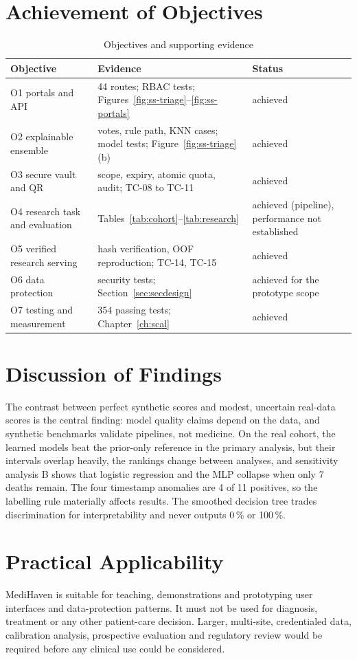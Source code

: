 \section{Achievement of Objectives}
\begin{table}[!htbp]
\centering
\caption{Objectives and supporting evidence}
\label{tab:objectives}
\small
\begin{tabularx}{\textwidth}{@{}lYl@{}}
\toprule
Objective & Evidence & Status\\
\midrule
O1 portals and API & 44 routes; RBAC tests; Figures~\ref{fig:ss-triage}--\ref{fig:ss-portals} & achieved\\
O2 explainable ensemble & votes, rule path, KNN cases; model tests; Figure~\ref{fig:ss-triage}(b) & achieved\\
O3 secure vault and QR & scope, expiry, atomic quota, audit; TC-08 to TC-11 & achieved\\
O4 research task and evaluation & Tables~\ref{tab:cohort}--\ref{tab:research} & achieved (pipeline), performance not established\\
O5 verified research serving & hash verification, OOF reproduction; TC-14, TC-15 & achieved\\
O6 data protection & security tests; Section~\ref{sec:secdesign} & achieved for the prototype scope\\
O7 testing and measurement & 354 passing tests; Chapter~\ref{ch:scal} & achieved\\
\bottomrule
\end{tabularx}
\end{table}

\section{Discussion of Findings}
The contrast between perfect synthetic scores and modest, uncertain real-data scores is the central
finding: model quality claims depend on the data, and synthetic benchmarks validate pipelines, not
medicine. On the real cohort, the learned models beat the prior-only reference in the primary analysis,
but their intervals overlap heavily, the rankings change between analyses, and sensitivity analysis B
shows that logistic regression and the MLP collapse when only 7 deaths remain. The four timestamp anomalies
are 4 of 11 positives, so the labelling rule materially affects results. The smoothed decision tree trades
discrimination for interpretability and never outputs 0\,\% or 100\,\%.

\section{Practical Applicability}
MediHaven is suitable for teaching, demonstrations and prototyping user interfaces and data-protection
patterns. It must not be used for diagnosis, treatment or any other patient-care decision. Larger,
multi-site, credentialed data, calibration analysis, prospective evaluation and regulatory review would be
required before any clinical use could be considered.
